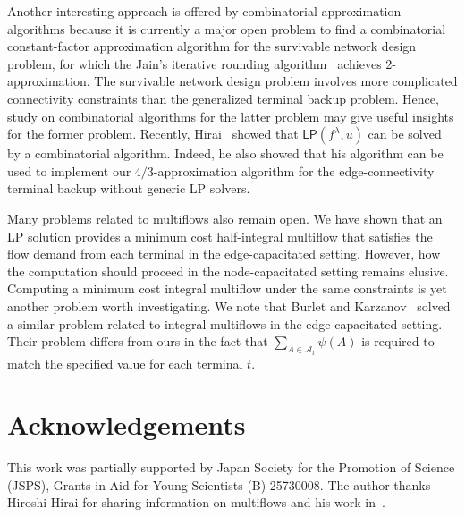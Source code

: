 \documentclass{article}
\newcommand{\Afam}{\mathcal{A}}
\newcommand{\lp}{\mathsf{LP}}
\newcommand{\g}{f^{\lambda}}
\begin{document}
Another interesting approach is offered by combinatorial 
approximation algorithms
because it is currently a major open problem to find 
a combinatorial constant-factor approximation
algorithm for the survivable network design problem,
for which 
the Jain's iterative rounding algorithm~\cite{Jain01}
achieves 2-approximation.
The survivable network design problem involves
more complicated connectivity constraints than the generalized terminal backup problem.
Hence, study on combinatorial algorithms for the 
latter problem may give useful insights for the 
former problem.
Recently, Hirai~\cite{Hirai14L-extendable} showed that $\lp(\g,u)$ can
be solved by a combinatorial algorithm. Indeed, he also showed that
his algorithm can be used to implement our $4/3$-approximation algorithm for the edge-connectivity
terminal backup without generic LP solvers.


Many problems related to multiflows also remain open. We have shown that 
an LP solution provides
a minimum cost half-integral
multiflow that satisfies the flow demand from each terminal
in the edge-capacitated setting. However, how the computation should proceed in 
the node-capacitated setting remains elusive.
Computing a minimum cost integral multiflow under the same constraints 
is yet another problem worth investigating. We note that
Burlet and Karzanov~\cite{BurletK98} solved a similar problem related to integral multiflows
in the edge-capacitated setting.
Their problem differs from ours in the fact that
$\sum_{A \in \Afam_t}\psi(A)$ is required to 
match the specified value for each terminal $t$.




\section*{Acknowledgements}
This work was partially supported by Japan Society for the Promotion of
Science (JSPS), Grants-in-Aid for Young Scientists (B) 25730008.
The author thanks Hiroshi Hirai for sharing information on multiflows
and his work in~\cite{Hirai14L-extendable}.
\end{document}
